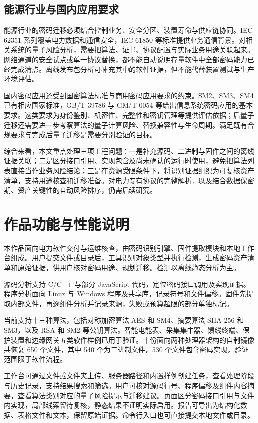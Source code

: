 \subsection{能源行业与国内应用要求}

能源行业的密码迁移必须结合控制业务、安全分区、装置寿命与供应链协同。IEC 62351 系列覆盖电力数据和通信安全，IEC 61850 等标准提供业务通信背景\cite{iec62351,iec61850}。对相关系统的量子风险分析，需要把算法、证书、协议配置与实际业务用途关联起来。网络通道的安全试点或单一协议替换，都不能自动说明存量软件中全部密码能力已经完成清点。离线发布包分析可补充其中的软件证据，但不能代替装置测试与生产环境评估。

国内密码应用还受到国密算法标准与商用密码应用要求的约束。SM2、SM3、SM4 已有相应国家标准\cite{gbt32918,gbt32905,gbt32907}，GB/T 39786 与 GM/T 0054 等给出信息系统密码应用的基本要求\cite{gbt39786,gmt0054}。这类要求为身份鉴别、机密性、完整性和密钥管理等提供评估依据；后量子迁移还需要进一步考察算法的量子计算风险、替换兼容性与生命周期。满足既有合规要求与完成后量子迁移是需要分别验证的目标。

综合来看，本文重点处理三项工程问题：一是补充源码、二进制与固件之间的离线证据关联；二是区分接口引用、实现包含及尚未确认的运行时使用，避免把算法列表直接当作业务风险结论；三是在资源受限条件下，将识别证据组织为可复核资产清单，支持用途核查和迁移准备。对电力专有协议的完整解析，以及结合数据保密期、资产关键性的自动风险排序，仍需后续研究。

\clearpage
\section{作品功能与性能说明}
本作品面向电力软件交付与运维核查，由密码识别引擎、固件提取模块和本地工作台组成。用户提交文件或目录后，工具识别对象类型并执行检测，生成密码资产清单和原始证据，供用户核对密码用途、规划迁移。检测以离线静态分析为主。

源码分析支持 C/C++ 与部分 JavaScript 代码，定位密码接口调用及实现证据。程序分析面向 Linux 与 Windows 程序及共享库，记录符号和文件偏移。固件先提取内部文件，再逐组件分析并记录来源，失败或预算超限的部分单独标记。

当前支持十三种算法，包括对称加密算法 AES 和 SM4、摘要算法 SHA-256 和 SM3，以及 RSA 和 SM2 等公钥算法。智能电能表、采集集中器、馈线终端、保护装置和边缘网关五类软件样例已用于验证。十份面向两种处理器架构的自制镜像共恢复 650 个文件，其中 540 个为二进制文件，530 个文件包含密码实现，验证范围限于软件流程。

工作台可通过文件或文件夹上传、服务器路径和内置样例创建任务，查看处理阶段与历史记录，支持结果搜索和筛选。用户可核对源码行号、程序偏移及组件内容摘要，查看算法类别对应的量子风险提示与迁移建议。页面区分密码接口引用与文件内实现，局部线索留待复核，静态结果不证明实际启用。报告可导出为结构化数据、表格文件和文本，保留原始证据。命令行入口也可直接提交本地文件或目录。

